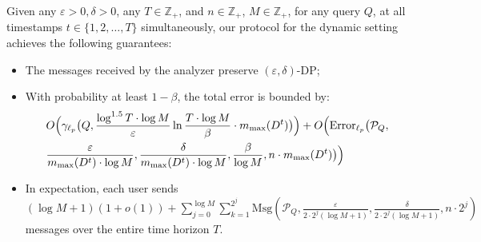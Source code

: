 \renewcommand{\thetheorem}{5.\arabic{theorem}}
\setcounter{theorem}{0} 
\begin{theorem}
    Given any $\varepsilon > 0, \delta > 0$, any $T \in \mathbb{Z}_+$, and $n \in \mathbb{Z}_+$, $M \in \mathbb{Z}_+$, for any query $Q$, at all timestamps $t \in \{1, 2, \dots, T\}$ simultaneously, our protocol for the dynamic setting achieves the following guarantees:
\begin{itemize}
    \item The messages received by the analyzer preserve $(\varepsilon,\delta)$-DP;
    \item With probability at least $1-\beta$, the total error is bounded by:
    \[
    \begin{aligned}
    &O\Big(\gamma_{\ell_p}\big( Q, \frac{\log ^{1.5} T \cdot \log M}{\varepsilon} \ln \frac{T \cdot \log M}{\beta} \cdot m_{\max}(D^t)\big)\Big) + O\Big(\mathrm{Error}_{\ell_p}\big(\mathcal{P}_Q,
    \\
    & \frac{\varepsilon}{m_{\max}(D^t) \cdot \log M}, \frac{\delta}{m_{\max}(D^t) \cdot \log M}, \frac{\beta}{\log M}, n \cdot m_{\max}(D^t)\big)\Big)
    \end{aligned}
    \]
    \item In expectation, each user sends $(\log M+1)(1+o(1)) + \sum_{j=0}^{\log M} \sum_{k=1}^{2^j} \mathrm{Msg}(\mathcal{P}_Q, \frac{\varepsilon}{2\cdot 2^j(\log M+1)}, \frac{\delta}{2\cdot 2^j(\log M+1)}, n \cdot 2^j)$ messages over the entire time horizon $T$.
\end{itemize}
\end{theorem}


